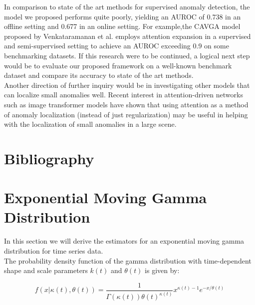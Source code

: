 \documentclass[12pt]{article}
\begin{document}
In comparison to state of the art methods for supervised anomaly detection, the model we proposed performs quite poorly, yielding an AUROC of 0.738 in an offline setting and 0.677 in an online setting. For example,the CAVGA model proposed by Venkataramanan et al. employs attention expansion in a supervised and semi-supervised setting to achieve an AUROC exceeding 0.9 \cite{attention_anomalies} on some benchmarking datasets. If this research were to be continued, a logical next step would be to evaluate our proposed framework on a well-known benchmark dataset and compare its accuracy to state of the art methods.\\

Another direction of further inquiry would be in investigating other models that can localize small anomalies well. Recent interest in attention-driven networks such as image transformer models \cite{image_transformers} have shown that using attention as a method of anomaly localization (instead of just regularization) may be useful in helping with the localization of small anomalies in a large scene.\\


\pagebreak
\section{Bibliography}


\pagebreak


\appendix

\section{Exponential Moving Gamma Distribution}\label{appendix:moving_gamma}

In this section we will derive the estimators for an exponential moving gamma distribution for time series data.\\


The probability density function of the gamma distribution with time-dependent shape and scale parameters $k(t)$ and $\theta(t)$ is given by:

\begin{equation}
f(x|\kappa(t), \theta(t)) = \frac{1}{\Gamma(\kappa(t))\theta(t)^{\kappa(t)}} x^{\kappa(t)-1}e^{-x/\theta(t)}
\label{eqn:time_dependent_gamma}
\end{equation}
\end{document}
